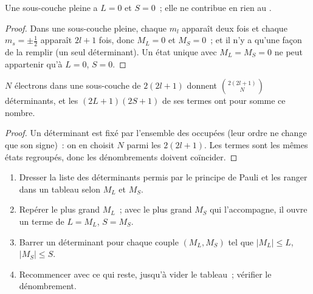 \begin{proposition}\label{prop:b3:many-electron-atoms:closed-shell}
Une sous-couche pleine a $L = 0$ et $S = 0$~; elle ne contribue en rien au
.
\end{proposition}

\begin{proof}
Dans une sous-couche pleine, chaque $m_l$ apparaît deux fois et chaque
$m_s = \pm\frac12$ apparaît $2l+1$ fois, donc $M_L = 0$ et $M_S = 0$~; et il
n'y a qu'une façon de la remplir (un seul déterminant). Un état unique
avec $M_L = M_S = 0$ ne peut appartenir qu'à $L = 0$, $S = 0$.
\end{proof}

\begin{proposition}\label{prop:b3:many-electron-atoms:count}
$N$ électrons dans une sous-couche de $2(2l+1)$  donnent
$\binom{2(2l+1)}{N}$ déterminants, et les  $(2L+1)(2S+1)$
de ses termes ont pour somme ce nombre.
\end{proposition}

\begin{proof}
Un déterminant est fixé par l'ensemble des  occupées (leur
ordre ne change que son signe)~: on en choisit $N$ parmi les $2(2l+1)$. Les
termes sont les mêmes états regroupés, donc les dénombrements doivent
coïncider.
\end{proof}

\begin{method}\label{met:b3:many-electron-atoms:terms}
\begin{enumerate}
  \item Dresser la liste des déterminants permis par le principe de Pauli
        et les ranger dans un tableau selon $M_L$ et $M_S$.
  \item Repérer le plus grand $M_L$~; avec le plus grand $M_S$ qui
        l'accompagne, il ouvre un terme de $L = M_L$, $S = M_S$.
  \item Barrer un déterminant pour chaque couple $(M_L, M_S)$ tel que
        $|M_L| \le L$, $|M_S| \le S$.
  \item Recommencer avec ce qui reste, jusqu'à vider le tableau~;
        vérifier le dénombrement.
\end{enumerate}
\end{method}

